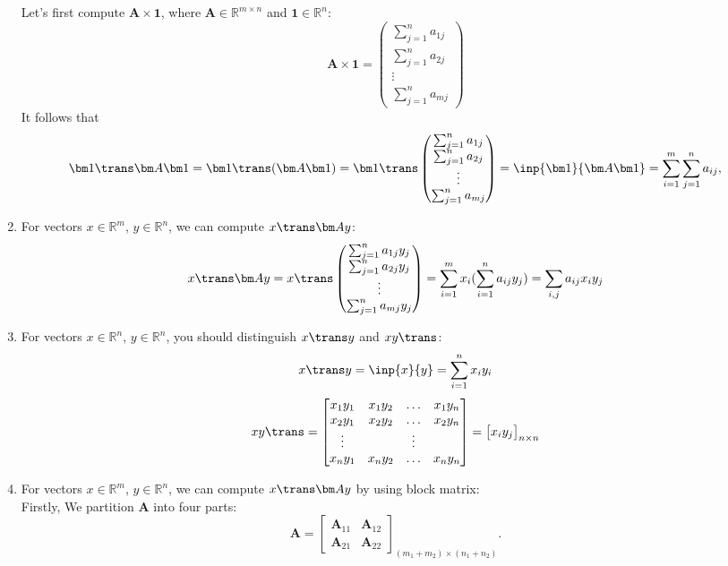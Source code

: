 \begin{enumerate}
Let's first compute $\bm A\times\bm 1$, where $\bm A\in\mathbb{R}^{m\times n}$ and $\bm 1\in\mathbb{R}^n$:
\[
\bm A\times\bm 1 = \begin{pmatrix}
\sum_{j=1}^{n}a_{1j}\\\sum_{j=1}^{n}a_{2j}\\\vdots\\\sum_{j=1}^{n}a_{mj}
\end{pmatrix}
\]
It follows that
\[
\bm 1\trans\bm A\bm 1 = \bm 1\trans(\bm A\bm 1) = \bm 1\trans\begin{pmatrix}
\sum_{j=1}^{n}a_{1j}\\\sum_{j=1}^{n}a_{2j}\\\vdots\\\sum_{j=1}^{n}a_{mj}
\end{pmatrix} = \inp{\bm 1}{\bm A\bm 1} = \sum_{i=1}^{m}\sum_{j=1}^{n}a_{ij},
\]
\item
For vectors $x\in\mathbb{R}^{m}$, $y\in\mathbb{R}^{n}$, we can compute $x\trans\bm A y$:
\[
x\trans\bm A y = x\trans\begin{pmatrix}
\sum_{j=1}^{n}a_{1j}y_j\\\sum_{j=1}^{n}a_{2j}y_j\\\vdots\\\sum_{j=1}^{n}a_{mj}y_j
\end{pmatrix} = \sum_{i=1}^{m}x_i(\sum_{i=1}^{n}a_{ij}y_j) = \sum_{i,j}a_{ij}x_iy_j
\]
\item
For vectors $x\in\mathbb{R}^{n}$, $y\in\mathbb{R}^{n}$, you should distinguish $x\trans y$ and $xy\trans$:
\[
x\trans y = \inp{x}{y}= \sum_{i=1}^{n}x_iy_i
\]
\[
xy\trans = \begin{bmatrix}
x_1y_1&x_1y_2&\ldots&x_1y_n\\
x_2y_1&x_2y_2&\ldots&x_2y_n\\
\vdots&&\vdots\\
x_ny_1&x_ny_2&\ldots&x_ny_n\\
\end{bmatrix} = \begin{bmatrix}
x_iy_j
\end{bmatrix}_{n\times n}
\]
\item
For vectors $x\in\mathbb{R}^{m}$, $y\in\mathbb{R}^{n}$, we can compute $x\trans\bm A y$ by using block matrix:\\
Firstly, We partition $\bm A$ into four parts:
\[
\bm A = \begin{bmatrix}
\bm A_{11}&\bm A_{12}\\\bm A_{21}&\bm A_{22}
\end{bmatrix}_{(m_1+m_2)\times(n_1+n_2)}.
\]


\end{enumerate}
